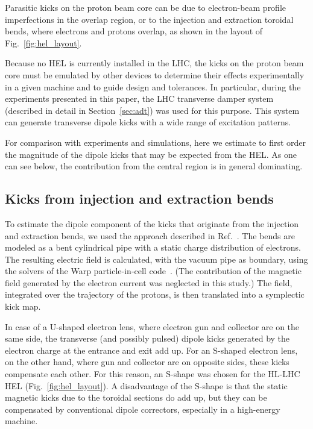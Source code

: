 \documentclass[%
 reprint,
 amsmath,amssymb,
 aps,
prstab,
longbibliography
]{revtex4-1}
\begin{document}
Parasitic kicks on the proton beam core can be due to electron-beam
profile imperfections in the overlap region, or to the injection and
extraction toroidal bends, where electrons and protons overlap, as
shown in the layout of Fig.~\ref{fig:hel_layout}.

Because no HEL is currently installed in the LHC, the kicks on the
proton beam core must be emulated by other devices to determine their
effects experimentally in a given machine and to guide design and
tolerances. In particular, during the experiments presented in this
paper, the LHC transverse damper system (described in detail in
Section~\ref{sec:adt}) was used for this purpose. This system can
generate transverse dipole kicks with a wide range of excitation
patterns.

For comparison with experiments and simulations, here we estimate to
first order the magnitude of the dipole kicks that may be expected
from the HEL. As one can see below, the contribution from the central
region is in general dominating.


\subsection{Kicks from injection and extraction bends}
\label{core:sec:1}

To estimate the dipole component of the kicks that originate from the
injection and extraction bends, we used the approach described in
Ref.~\cite{hel_bends_stancari}. The bends are modeled as a bent
cylindrical pipe with a static charge distribution of electrons. The
resulting electric field is calculated, with the vacuum pipe as
boundary, using the solvers of the Warp particle-in-cell
code~\cite{warp}. (The contribution of the magnetic field generated by
the electron current was neglected in this study.) The field,
integrated over the trajectory of the protons, is then translated into
a symplectic kick map.

In case of a U-shaped electron lens, where electron gun and collector
are on the same side, the transverse (and possibly pulsed) dipole
kicks generated by the electron charge at the entrance and exit add
up. For an S-shaped electron lens, on the other hand, where gun and
collector are on opposite sides, these kicks compensate each
other. For this reason, an S-shape was chosen for the HL-LHC HEL
(Fig.~\ref{fig:hel_layout}). A disadvantage of the S-shape is that the
static magnetic kicks due to the toroidal sections do add up, but they
can be compensated by conventional dipole correctors, especially in a
high-energy machine.
\end{document}
